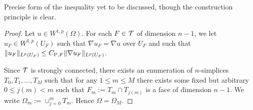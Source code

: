 \documentclass[a4paper]{amsart}
\begin{document}
\begin{theorem}\label{theorem:poincarefriedrichsestimate:grad}
    \color{red}Precise form of the inequality yet to be discussed, though the construction principle is clear.
\end{theorem}

\begin{proof}
 Let $u \in W^{1,p}(\Omega)$. 
 For each $F \in {\mathcal T}$ of dimension $n-1$, 
 we let $u_F \in W^{1,p}(U_F)$ such that $\nabla u_F = \nabla u$ over $U_F$ and such that $\| u_F \|_{L^{p}(U_F)} \leq C_{{\rm{P}},F} \| \nabla u_F \|_{L^{p}(U_F)}$.
 
 Since ${\mathcal T}$ is strongly connected, there exists an enumeration of $n$-simplices $T_0, T_1, \dots, T_M$ such that for any $1 \leq m \leq M$ there exists some fixed but arbitrary $0 \leq j(m) < m$ such that $F_m := T_m \cap T_{j(m)}$ is a face of dimension $n-1$. We write $\Omega_m := \cup_{j=0}^{m} T_m$. Hence $\Omega = \Omega_M$. 
 
 
 

\end{proof}
\end{document}
